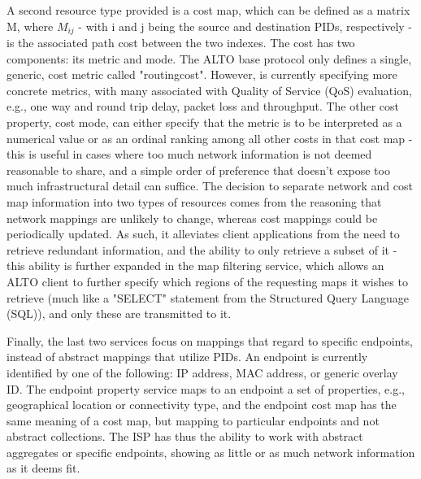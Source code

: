    A second resource type provided is a cost map, which can be defined as a matrix M, where $M_{ij}$ - with i and j being the source and destination PIDs, respectively - is the associated path cost between the two indexes.
    The cost has two components: its metric and mode.
    The ALTO base protocol only defines a single, generic, cost metric called "routingcost".
    However, \cite{alto-metrics} is currently specifying more concrete metrics, with many associated with Quality of Service (QoS) evaluation, e.g., one way and round trip delay, packet loss and throughput.
    The other cost property, cost mode, can either specify that the metric is to be interpreted as a numerical value or as an ordinal ranking among all other costs in that cost map - this is useful in cases where too much network information is not deemed reasonable to share, and a simple order of preference that doesn't expose too much infrastructural detail can suffice.
    The decision to separate network and cost map information into two types of resources comes from the reasoning that network mappings are unlikely to change, whereas cost mappings could be periodically updated.
    As such, it alleviates client applications from the need to retrieve redundant information, and the ability to only retrieve a subset of it - this ability is further expanded in the map filtering service, which allows an ALTO client to further specify which regions of the requesting maps it wishes to retrieve (much like a "SELECT" statement from the Structured Query Language (SQL)), and only these are transmitted to it.

    Finally, the last two services focus on mappings that regard to specific endpoints, instead of abstract mappings that utilize PIDs.
    An endpoint is currently identified by one of the following: IP address, MAC address, or generic overlay ID.
    The endpoint property service maps to an endpoint a set of properties, e.g., geographical location or connectivity type, and the endpoint cost map has the same meaning of a cost map, but mapping to particular endpoints and not abstract collections.
    The ISP has thus the ability to work with abstract aggregates or specific endpoints, showing as little or as much network information as it deems fit.

